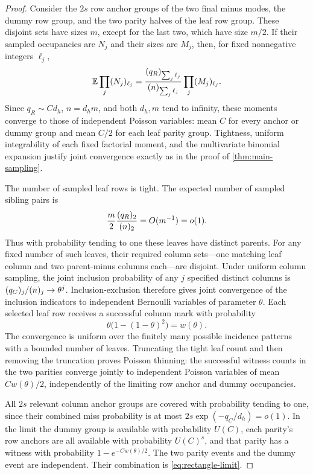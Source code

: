 \begin{proof}
Consider the \(2s\) row anchor groups of the two final minus modes,
the dummy row group, and the two parity halves of the leaf row group.
These disjoint sets have sizes \(m\), except for the last two, which
have size \(m/2\). If their sampled occupancies are \(N_j\) and their
sizes are \(M_j\), then, for fixed nonnegative integers \(\ell_j\),
\begin{equation}
 \mathbb E\prod_j(N_j)_{\ell_j}
 =\frac{(q_R)_{\sum_j\ell_j}}{(n)_{\sum_j\ell_j}}
       \prod_j(M_j)_{\ell_j}.
 \label{eq:occupancy-moments}
\end{equation}
Since \(q_R\sim Cd_h\), \(n=d_hm\), and both \(d_h,m\) tend to
infinity, these moments converge to those of independent Poisson
variables: mean \(C\) for every anchor or dummy group and mean \(C/2\)
for each leaf parity group. Tightness, uniform integrability of each
fixed factorial moment, and the multivariate binomial expansion justify
joint convergence exactly as in the proof of \cref{thm:main-sampling}.

The number of sampled leaf rows is tight. The expected number of
sampled sibling pairs is
\[
 \frac m2\frac{(q_R)_{2}}{(n)_{2}}=O(m^{-1})=o(1).
\]
Thus with probability tending to one these leaves have distinct
parents. For any fixed number of such leaves, their required column
sets---one matching leaf column and two parent-minus columns each---are
disjoint. Under uniform column sampling, the joint inclusion probability
of any \(j\) specified distinct columns is
\((q_C)_{j}/(n)_{j}\to\theta^j\). Inclusion-exclusion therefore
gives joint convergence of the inclusion indicators to independent
Bernoulli variables of parameter \(\theta\). Each selected leaf row
receives a successful column mark with probability
\[
 \theta\bigl(1-(1-\theta)^2\bigr)=w(\theta).
\]
The convergence is uniform over the finitely many possible incidence
patterns with a bounded number of leaves. Truncating the tight leaf
count and then removing the truncation proves Poisson thinning: the
successful witness counts in the two parities converge jointly to
independent Poisson variables of mean \(Cw(\theta)/2\), independently
of the limiting row anchor and dummy occupancies.

All \(2s\) relevant column anchor groups are covered with probability
tending to one, since their combined miss probability is at most
\(2s\exp(-q_C/d_h)=o(1)\). In the limit the dummy group is available
with probability \(U(C)\), each parity's row anchors are all available
with probability \(U(C)^s\), and that parity has a witness with
probability \(1-e^{-Cw(\theta)/2}\). The two parity events and the
dummy event are independent. Their combination is
\eqref{eq:rectangle-limit}.
\end{proof}

